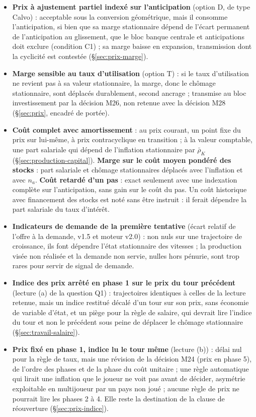 \documentclass[11pt,a4paper]{article}
\begin{document}
\begin{itemize}
\item \textbf{Prix à ajustement partiel indexé sur l'anticipation} (option D, de type Calvo) : acceptable sous la conversion géométrique, mais il consomme l'anticipation, si bien que sa marge stationnaire dépend de l'écart permanent de l'anticipation au glissement, que le bloc banque centrale et anticipations doit exclure (condition C1) ; sa marge baisse en expansion, transmission dont la cyclicité est contestée (\S\ref{sec:prix-marge}).
\item \textbf{Marge sensible au taux d'utilisation} (option T) : si le taux d'utilisation ne revient pas à sa valeur stationnaire, la marge, donc le chômage stationnaire, sont déplacés durablement, second ancrage ; transmise au bloc investissement par la décision M26, non retenue avec la décision M28 (\S\ref{sec:prix}, encadré de portée).
\item \textbf{Coût complet avec amortissement} : au prix courant, un point fixe du prix sur lui-même, à prix contracyclique en transition ; à la valeur comptable, une part salariale qui dépend de l'inflation stationnaire par $\bar\rho_K$ (\S\ref{sec:production-capital}). \textbf{Marge sur le coût moyen pondéré des stocks} : part salariale et chômage stationnaires déplacés avec l'inflation et avec $n_a$. \textbf{Coût retardé d'un pas} : exact seulement avec une indexation complète sur l'anticipation, sans gain sur le coût du pas. Un coût historique avec financement des stocks est noté sans être instruit : il ferait dépendre la part salariale du taux d'intérêt.
\item \textbf{Indicateurs de demande de la première tentative} (écart relatif de l'offre à la demande, v1.5 et moteur v2.0) : non nuls sur une trajectoire de croissance, ils font dépendre l'état stationnaire des vitesses ; la production visée non réalisée et la demande non servie, nulles hors pénurie, sont trop rares pour servir de signal de demande.
\item \textbf{Indice des prix arrêté en phase 1 sur le prix du tour précédent} (lecture (a) de la question Q1) : trajectoires identiques à celles de la lecture retenue, mais un indice restitué décalé d'un tour sur son prix, sans économie de variable d'état, et un piège pour la règle de salaire, qui devrait lire l'indice du tour et non le précédent sous peine de déplacer le chômage stationnaire (\S\ref{sec:travail-salaire}).
\item \textbf{Prix fixé en phase 1, indice lu le tour même} (lecture (b)) : délai nul pour la règle de taux, mais une révision de la décision M24 (prix en phase 5), de l'ordre des phases et de la phase du coût unitaire ; une règle automatique qui lirait une inflation que le joueur ne voit pas avant de décider, asymétrie exploitable en multijoueur par un pays non joué ; aucune règle de prix ne pourrait lire les phases 2 à 4. Elle reste la destination de la clause de réouverture (\S\ref{sec:prix-indice}).

\end{itemize}
\end{document}

